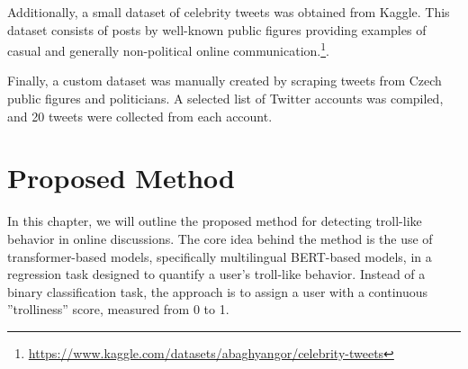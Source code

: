 \documentclass[twoside]{ctuthesis}
\theoremstyle{plain}
\theoremstyle{definition}
\theoremstyle{note}
\begin{document}
Additionally, a small dataset of celebrity tweets was obtained from Kaggle. This dataset consists of posts by well-known public figures providing examples of casual and generally non-political online communication.\footnote{\url{https://www.kaggle.com/datasets/abaghyangor/celebrity-tweets}}.\par

Finally, a custom dataset was manually created by scraping tweets from Czech public figures and politicians. A selected list of Twitter accounts was compiled, and 20 tweets were collected from each account. \par

\chapter{Proposed Method}
In this chapter, we will outline the proposed method for detecting troll-like behavior in online discussions. The core idea behind the method is the use of transformer-based models, specifically multilingual BERT-based models, in a regression task designed to quantify a user's troll-like behavior. Instead of a binary classification task, the approach is to assign a user with a continuous ''trolliness'' score, measured from 0 to 1.\par
\end{document}
